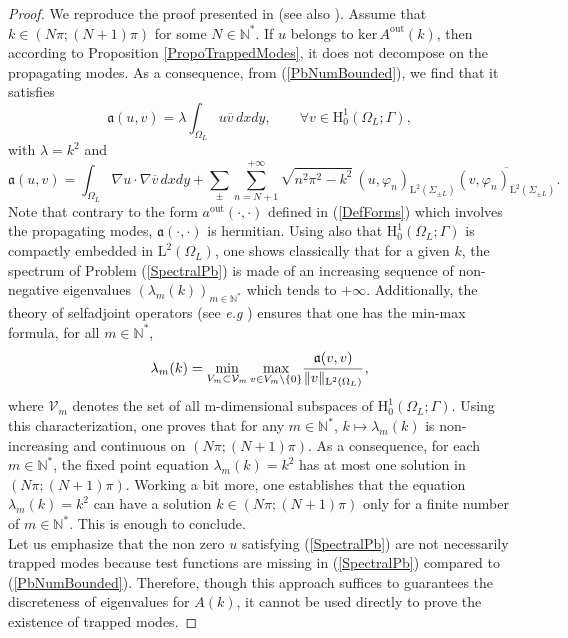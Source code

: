 \documentclass[11pt,a4paper]{report}
\newcommand{\dsp}{\displaystyle}
\newcommand{\Om}{\Omega}
\newcommand{\mrm}[1]{\mathrm{#1}}
\newcommand{\N}{\mathbb{N}}
\newcommand{\mL}{\mrm{L}}
\newcommand{\mH}{\mrm{H}}
\renewcommand{\ker}{\mrm{ker}}
\begin{document}
\begin{proof}
We reproduce the proof presented in \cite[Thm.\,3.3]{BoSt94} (see also \cite[Thm.\,2.2]{BoLu12}). 
Assume that $k\in(N\pi;(N+1)\pi)$ for some $N\in\N^\ast$. If $u$ belongs to $\ker\,A^{\mrm{out}}(k)$, then according to Proposition \ref{PropoTrappedModes}, it does not decompose on the propagating modes. As a consequence, from (\ref{PbNumBounded}), we find that it satisfies
\begin{equation}\label{SpectralPb}
\mathfrak{a}(u,v)=
\lambda \dsp\int_{\Om_L}u\overline{v}\,dxdy,\qquad\forall v\in \mH^1_0(\Om_L;\Gamma),
\end{equation}
with $\lambda=k^2$ and 
\[
\mathfrak{a}(u,v)=\dsp\int_{\Om_L}\nabla u\cdot\nabla\overline{v}\,dxdy+\sum_\pm\sum_{n=N+1}^{+\infty} \sqrt{n^2\pi^2-k^2}\, (u,\varphi_n)_{\mL^2(\Sigma_{\pm L})}\overline{(v,\varphi_n)_{\mL^2(\Sigma_{\pm L})}}.
\]
Note that contrary to the form $a^{\mrm{out}}(\cdot,\cdot)$ defined in (\ref{DefForms}) which involves the propagating modes, $\mathfrak{a}(\cdot,\cdot)$ is hermitian. Using also that $\mH^1_0(\Om_L;\Gamma)$ is compactly embedded in $\mL^2(\Om_L)$, one shows classically that for a given $k$, the spectrum of Problem (\ref{SpectralPb}) is made of an increasing sequence of 
non-negative eigenvalues $(\lambda_m(k))_{m\in\N^\ast}$ which tends to $+\infty$. Additionally, the theory of selfadjoint operators (see \textit{e.g} \cite[Chap.\,3]{Wein74}) ensures that one has the min-max formula, for all $m\in\N^\ast$,
\[
\lambda_m(k) =\underset{ V_m\subset\mathcal{V}_m}{\min}\,\underset{v\in V_m\setminus\{0\}}{\max}\cfrac{\mathfrak{a}(v,v)}{\|v\|_{\mL^2(\Om_L)}}\,,
\]
where $\mathcal{V}_m$ denotes the set of all m-dimensional subspaces of $\mH^1_0(\Om_L;\Gamma)$. Using this characterization, one proves that for any $m\in\N^\ast$, $k\mapsto \lambda_m(k)$ is non-increasing and continuous on $(N\pi;(N+1)\pi)$. As a consequence, for each $m\in\N^\ast$, the fixed point equation  $\lambda_m(k)=k^2$ has at most one solution in $(N\pi;(N+1)\pi)$. Working a bit more, one establishes that the equation  $\lambda_m(k)=k^2$ can have a solution $k\in (N\pi;(N+1)\pi)$ only for a finite number of $m\in\N^\ast$. This is enough to conclude.\\ 
\newline
Let us emphasize that the non zero $u$ satisfying (\ref{SpectralPb}) are not necessarily trapped modes because test functions are missing in (\ref{SpectralPb}) compared to (\ref{PbNumBounded}). Therefore, though this approach suffices to guarantees the discreteness of eigenvalues for $A(k)$, it cannot be used directly to prove the existence of trapped modes.
\end{proof}
\end{document}
